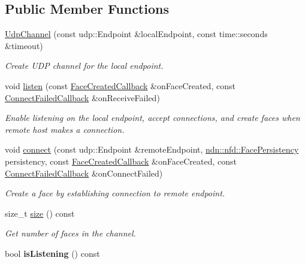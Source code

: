 \subsection*{Public Member Functions}
\begin{DoxyCompactItemize}
\item 
\hyperlink{classnfd_1_1UdpChannel_a763d929e20afb0c643a9ce21743fd72e}{Udp\+Channel} (const udp\+::\+Endpoint \&local\+Endpoint, const time\+::seconds \&timeout)
\begin{DoxyCompactList}\small\item\em Create U\+DP channel for the local endpoint. \end{DoxyCompactList}\item 
void \hyperlink{classnfd_1_1UdpChannel_aa6007aac664051294f7739004d09f2ab}{listen} (const \hyperlink{classnfd_1_1Channel_a47f1a8874228ad9dfa38b4e96f6f8d57}{Face\+Created\+Callback} \&on\+Face\+Created, const \hyperlink{classnfd_1_1Channel_a090bac376b438fb150ce740c2839375b}{Connect\+Failed\+Callback} \&on\+Receive\+Failed)
\begin{DoxyCompactList}\small\item\em Enable listening on the local endpoint, accept connections, and create faces when remote host makes a connection. \end{DoxyCompactList}\item 
void \hyperlink{classnfd_1_1UdpChannel_afa6d133e8de1e4762607a49fa6144116}{connect} (const udp\+::\+Endpoint \&remote\+Endpoint, \hyperlink{group__management_ga05df4b7c484a0fae25d3e65962511bac}{ndn\+::nfd\+::\+Face\+Persistency} persistency, const \hyperlink{classnfd_1_1Channel_a47f1a8874228ad9dfa38b4e96f6f8d57}{Face\+Created\+Callback} \&on\+Face\+Created, const \hyperlink{classnfd_1_1Channel_a090bac376b438fb150ce740c2839375b}{Connect\+Failed\+Callback} \&on\+Connect\+Failed)
\begin{DoxyCompactList}\small\item\em Create a face by establishing connection to remote endpoint. \end{DoxyCompactList}\item 
size\+\_\+t \hyperlink{classnfd_1_1UdpChannel_a3cd5b2940d8b6a8981bdb684c28edf01}{size} () const\hypertarget{classnfd_1_1UdpChannel_a3cd5b2940d8b6a8981bdb684c28edf01}{}\label{classnfd_1_1UdpChannel_a3cd5b2940d8b6a8981bdb684c28edf01}

\begin{DoxyCompactList}\small\item\em Get number of faces in the channel. \end{DoxyCompactList}\item 
bool {\bfseries is\+Listening} () const\hypertarget{classnfd_1_1UdpChannel_a975d88eaa354e3846243e9a219b2ebc9}{}\label{classnfd_1_1UdpChannel_a975d88eaa354e3846243e9a219b2ebc9}

\end{DoxyCompactItemize}
